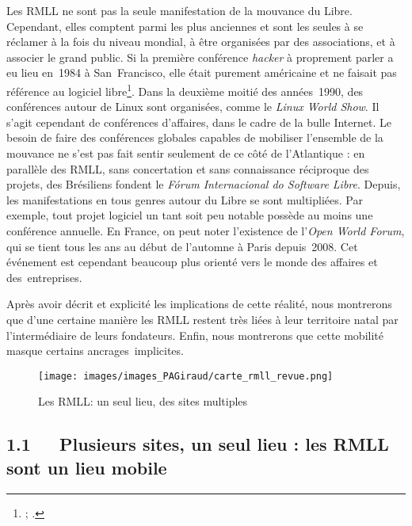 \documentclass{FramateX}
\begin{document}
\begin{refsection}
Les RMLL ne sont pas la seule manifestation de la mouvance du Libre.
Cependant, elles comptent parmi les plus anciennes et sont les seules à
se réclamer à la fois du niveau mondial, à être organisées par des
associations, et à associer le grand public. Si la première conférence
\textit{hacker} à proprement parler a eu lieu en~1984 à San~Francisco,
elle était purement américaine et ne faisait pas référence au logiciel
libre\footnote{\cite{Turner2006}; \cite{colemanhacker2010}.}. Dans la deuxième moitié des années~1990,
des conférences autour de Linux sont organisées, comme le \textit{Linux
World Show}. Il s'agit cependant de conférences d'affaires, dans le
cadre de la bulle Internet. Le besoin de faire des conférences globales
capables de mobiliser l'ensemble de la mouvance ne s'est pas fait
sentir seulement de ce côté de l'Atlantique : en parallèle des RMLL,
sans concertation et sans connaissance réciproque des projets, des
Brésiliens fondent le \textit{Fórum Internacional do
Software Libre}. Depuis, les manifestations en tous genres autour du
Libre se sont multipliées. Par exemple, tout projet logiciel un tant
soit peu notable possède au moins une conférence annuelle. En France,
on peut noter l'existence de l'\textit{Open World Forum}, qui se tient
tous les ans au début de l'automne à Paris depuis~2008. Cet événement
est cependant beaucoup plus orienté vers le monde des affaires et
des~entreprises.

Après avoir décrit et explicité les implications de cette réalité, nous
montrerons que d'une certaine manière les RMLL restent très liées à
leur territoire natal par l'intermédiaire de leurs fondateurs. Enfin,
nous montrerons que cette mobilité masque certains ancrages~implicites.

\begin{figure}
\centering
\texttt{[image: images/images\_PAGiraud/carte\_rmll\_revue.png]}
\caption{Les RMLL: un seul lieu, des sites multiples}
\end{figure}



\subsection*{1.1~~~Plusieurs sites, un seul lieu : les RMLL sont un lieu mobile}
{}


\end{refsection}
\end{document}
